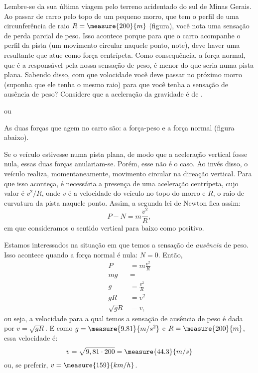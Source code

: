 \begin{question}
	Lembre-se da sua última viagem pelo terreno acidentado do sul de Minas Gerais.
	Ao passar de carro pelo topo de um pequeno morro, que tem o perfil de uma circunferência de raio $R = \measure{200}{m}$ (figura), você nota uma sensação de perda parcial de peso.
	Isso acontece porque para que o carro acompanhe o perfil da pista (um movimento circular naquele ponto, note), deve haver uma resultante que atue como força centrípeta.
	Como consequência, a força normal, que é a responsável pela nossa sensação de peso, é menor do que seria numa pista plana.
	Sabendo disso, com que volocidade você deve passar no próximo morro (suponha que ele tenha o mesmo raio) para que você tenha a sensação de ausência de peso?
	Considere que a aceleração da gravidade é de .


	\begin{answer}
		 ou 
	\end{answer}

	\begin{solution}
		As duas forças que agem no carro são: a força-peso e a força normal (figura abaixo).


		Se o veículo estivesse numa pista plana, de modo que a aceleração vertical fosse nula, essas duas forças anulariam-se.
		Porém, esse não é o caso.
		Ao invés disso, o veículo realiza, momentaneamente, movimento circular na direação vertical.
		Para que isso aconteça, é necessária a presença de uma aceleração centrípeta, cujo valor é $v^2/R$, onde $v$ é a velocidade do veículo no topo do morro e $R$, o raio de curvatura da pista naquele ponto.
		Assim, a segunda lei de Newton fica assim:
		\begin{equation*}
			P - N = m\frac{v^2}{R},
		\end{equation*}
		em que consideramos o sentido vertical para baixo como positivo.

		Estamos interessados na situação em que temos a sensação de \emph{ausência} de peso.
		Isso acontece quando a força normal é nula: $N = 0$.
		Então,
		\begin{align*}
			P  &= m\frac{v^2}{R} \\
			mg &= \\
			g  &= \frac{v^2}{R} \\
			gR &= v^2 \\
			\sqrt{gR} &= v,
		\end{align*}
		ou seja, a velocidade para a qual temos a sensação de ausência de peso é dada por $v = \sqrt{gR}$.
		E como $g = \measure{9.81}{m/s^2}$ e $R = \measure{200}{m}$, essa velocidade é:
		\begin{equation*}
			v = \sqrt{9,81 \cdot 200} = \measure{44.3}{m/s}
		\end{equation*}
		ou, se preferir, $v = \measure{159}{km/h}$.
	\end{solution}
\end{question}

\begin{comment}
	```python
	def exercicio_8(r, g = 9.81):
		return(sqrt(g*r))
	```
\end{comment}